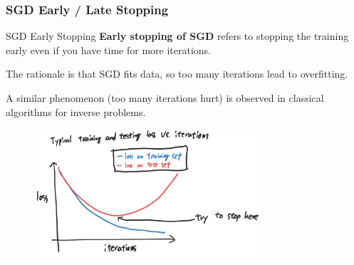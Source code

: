 \subsubsection{SGD Early / Late Stopping}

\begin{frame}[allowframebreaks]

\begin{mydefinitionblock}{6.16}{SGD Early Stopping}
    \textbf{Early stopping of SGD} refers to stopping the training early even if you have time for more iterations.

    The rationale is that SGD fits data, so too many iterations lead to overfitting.

    A similar phenomenon (too many iterations hurt) is observed in classical algorithms for inverse problems.

    \begin{figure}[H]
        \centering
        \includegraphics[width=0.75\textwidth]{.././assets/6.7.png}
    \end{figure}
\end{mydefinitionblock}

\end{frame}

